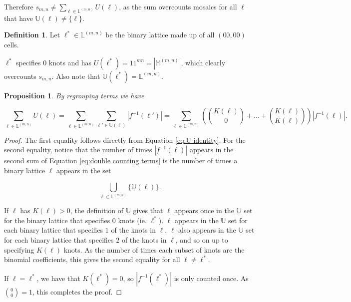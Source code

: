 \documentclass[12pt]{article}
\theoremstyle{plain}
\newtheorem{prop}[thm]{Proposition}
\theoremstyle{definition}
\newtheorem{definition}{Definition}[section]
\theoremstyle{remark}
\theoremstyle{definition}
\begin{document}
Therefore $s_{m,n} \neq \sum_{\ell \in \mathbb{L}^{(m,n)}} U(\ell)$, as the sum overcounts mosaics for all $\ell$ that have $\mathbb{U}(\ell) \neq \{\ell\}$. 

\begin{definition}
    Let $\ell^* \in \mathbb{L}^{(m,n)}$ be the binary lattice made up of all $(00,00)$ cells.
    \label{def:all zeros}
\end{definition}

$\ell^*$ specifies $0$ knots and has $U(\ell^*) = 11^{mn} = \left|\mathbb{M}^{(m,n)}\right|$, which clearly overcounts $s_{m,n}$. Also note that $\mathbb{U}(\ell^*) = \mathbb{L}^{(m,n)}$.


\begin{prop}
    By regrouping terms we have

    \begin{equation}
        \sum_{\ell \in \mathbb{L}^{(m,n)}} U(\ell) = \sum_{\ell \in \mathbb{L}^{(m,n)}}\sum_{\ell' \in \mathbb{U}(\ell)}|f^{-1}(\ell')| = \sum_{\ell \in \mathbb{L}^{(m,n)}} \left(\binom{K(\ell)}{0} + \dots + \binom{K(\ell)}{K(\ell)}\right)|f^{-1}(\ell)|.
        \label{eq:double counting terms}
    \end{equation}
\end{prop}

\begin{proof}
    The first equality follows directly from Equation \ref{eq:U identity}. For the second equality, notice that the number of times $|f^{-1}(\ell)|$ appears in the second sum of Equation \ref{eq:double counting terms} is the number of times a binary lattice $\ell$ appears in the set

    $$\bigcup_{\ell \in \mathbb{L}^{(m,n)}} \{\mathbb{U}(\ell)\}.$$
    
    If $\ell$ has $K(\ell)>0$, the definition of $\mathbb{U}$ gives that $\ell$ appears once in the $\mathbb{U}$ set for the binary lattice that specifies $0$ knots (ie. $\ell^*$). $\ell$ appears in the $\mathbb{U}$ set for each binary lattice that specifies $1$ of the knots in $\ell$. $\ell$ also appears in the $\mathbb{U}$ set for each binary lattice that specifies $2$ of the knots in $\ell$, and so on up to specifying $K(\ell)$ knots. As the number of times each subset of knots are the binomial coefficients, this gives the second equality for all $\ell \neq \ell^*$.

    If $\ell = \ell^*$, we have that $K(\ell^*)=0$, so $|f^{-1}(\ell^*)|$ is only counted once. As $\binom{0}{0}=1$, this completes the proof.
\end{proof}
\end{document}
